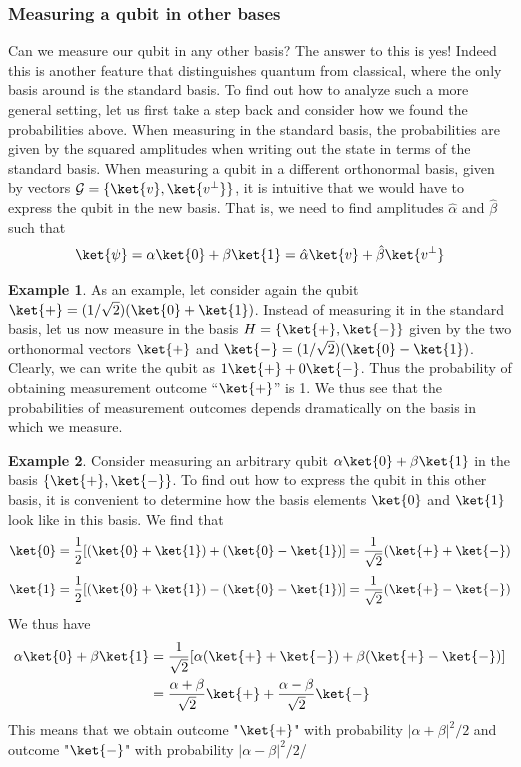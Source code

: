 \documentclass[12pt, oneside]{book}
\theoremstyle{definition}
\theoremstyle{definition}
\newtheorem{example}{Example}[section]
\theoremstyle{remark}
\begin{document}
\subsubsection{Measuring a qubit in other bases}
Can we measure our qubit in any other basis? The answer to this is yes! Indeed this is another
feature that distinguishes quantum from classical, where the only basis around is the standard basis.
To find out how to analyze such a more general setting, let us first take a step back and consider
how we found the probabilities above. When measuring in the standard basis, the probabilities are given by the squared amplitudes when writing out the state in terms of the standard basis. When
measuring a qubit in a different orthonormal basis, given by vectors $\mathcal{G}=\{\ket{v},\ket{v^\perp}\}$, it is intuitive that we would have to express the qubit in the new basis. That is, we need to find amplitudes $\hat{\alpha}$ and $\hat{\beta}$ such that
\[
\ket{\psi}=\alpha\ket{0}+\beta\ket{1}=\hat{\alpha} \ket{v}+\hat{\beta}\ket{v^{\perp}}
\]
\begin{example}
    As an example, let consider again the qubit $\ket{+}=(1/\sqrt{2})(\ket{0}+\ket{1})$. Instead
of measuring it in the standard basis, let us now measure in the basis $H = \{\ket{+},\ket{-}\}$ given by
the two orthonormal vectors $\ket{+}$ and $\ket{-} = (1/\sqrt{2})(\ket{0}-\ket{1})$. Clearly, we can write the qubit as $1\ket{+}+0\ket{-}$. Thus the probability of obtaining measurement outcome “$\ket{+}$” is 1. We thus see
that the probabilities of measurement outcomes depends dramatically on the basis in which we
measure. 
\end{example}

\begin{example}
    Consider measuring an arbitrary qubit $\alpha\ket{0}+\beta\ket{1}$ in the basis $\{\ket{+},\ket{-}\}$. To
find out how to express the qubit in this other basis, it is convenient to determine how the basis
elements $\ket{0}$ and $\ket{1}$ look like in this basis. We find that
\[
\ket{0}=\frac{1}{2}[(\ket{0}+\ket{1})+(\ket{0}-\ket{1})]=\frac{1}{\sqrt{2}}(\ket{+}+\ket{-})
\]
\[
\ket{1}=\frac{1}{2}[(\ket{0}+\ket{1})-(\ket{0}-\ket{1})]=\frac{1}{\sqrt{2}}(\ket{+}-\ket{-})
\]
We thus have
\begin{align*}
\alpha\ket{0}+\beta\ket{1}&=\frac{1}{\sqrt{2}}[\alpha(\ket{+}+\ket{-})+\beta(\ket{+}-\ket{-})]\\
&=\frac{\alpha+\beta}{\sqrt{2}}\ket{+}+\frac{\alpha-\beta}{\sqrt{2}}\ket{-}
\end{align*}
This means that we obtain outcome "$\ket{+}$" with probability $|\alpha+\beta|^2/2$ and outcome "$\ket{-}$" with probability $|\alpha-\beta|^2/2$/
\end{example}
\end{document}
